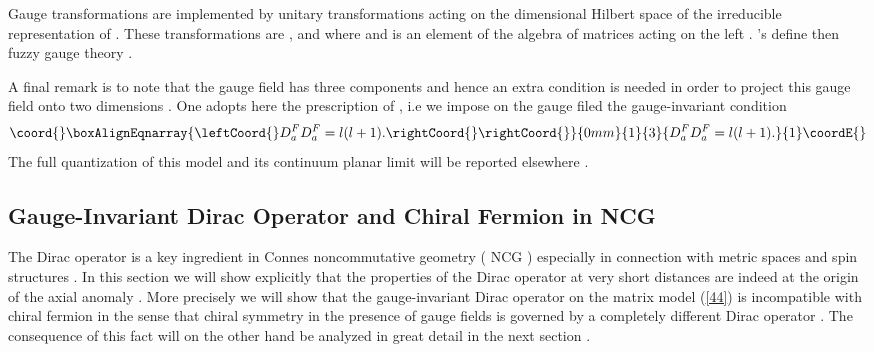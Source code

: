 \documentclass[a4paper,10pt]{article}
\begin{document}
Gauge transformations are implemented by unitary transformations
acting on the \coordHE{}dimensional Hilbert space of the
irreducible representation \coordHE{} of \coordHE{} . These transformations
are \coordHE{} ,
\coordHE{}
and \coordHE{}
where \coordHE{} and \coordHE{} is
an element of the algebra \coordHE{} of \coordHE{}
matrices acting on the left . \coordHE{}'s define then fuzzy \coordHE{}
gauge theory .

A final remark is to note that the gauge field \coordHE{} has
three components and hence an extra condition is needed in order
to project this gauge field onto two dimensions . One adopts here
the prescription of \cite{nair} , i.e we impose on the gauge
filed \coordHE{} the gauge-invariant condition
\begin{eqnarray}\coord{}\boxAlignEqnarray{\leftCoord{}
D_a^FD_a^F=l(l+1).\rightCoord{}\label{local}
\rightCoord{}}{0mm}{1}{3}{
D_a^FD_a^F=l(l+1).}{1}\coordE{}\end{eqnarray}
The full quantization of this model and its continuum planar
limit will be reported elsewhere \cite{badis} .

\subsection{Gauge-Invariant Dirac Operator and Chiral Fermion in
NCG}

The Dirac operator is a key ingredient in Connes noncommutative
geometry ( NCG ) especially in connection with metric spaces and
spin structures \cite{cmlv} . In this section we will show
explicitly that the properties of the Dirac operator at very
short distances are indeed at the origin of the axial anomaly .
More precisely we will show that the gauge-invariant Dirac
operator \coordHE{} on the matrix model (\ref{44}) is incompatible
with chiral fermion in the sense that chiral symmetry in the
presence of gauge fields is governed by a completely different
Dirac operator \coordHE{} . The consequence of this fact will on
the other hand be analyzed in great detail in the next section .
\end{document}
